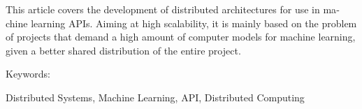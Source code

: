 \begin{resumo}[Abstract]
  \begin{otherlanguage}{english}
	  This article covers the development of distributed architectures for use in machine learning APIs. Aiming at high scalability, it is mainly based on the problem of projects that demand a high amount of computer models for machine learning, given a better shared distribution of the entire project.

Keywords:

Distributed Systems, Machine Learning, API, Distributed Computing
  \end{otherlanguage}
\end{resumo}